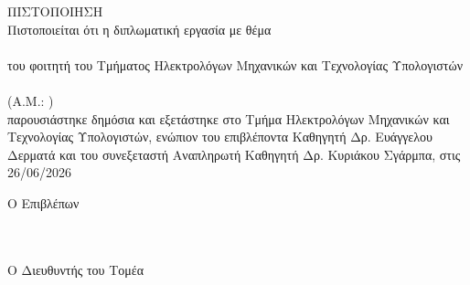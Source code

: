\pagestyle{empty}
\begin{center}
{\LARGE ΠΙΣΤΟΠΟΙΗΣΗ\\[1cm]}
\large Πιστοποιείται ότι η διπλωματική εργασία με θέμα\\[1cm]
\textbf{\large \doctitlegr }\\[1cm]
του φοιτητή του Τμήματος Ηλεκτρολόγων Μηχανικών και Τεχνολογίας Υπολογιστών\\[1.5cm]
\megr \\[0.5cm]
(Α.Μ.: \studnum )\\[1.5cm]
παρουσιάστηκε δημόσια και εξετάστηκε στο Τμήμα Ηλεκτρολόγων Μηχανικών και Τεχνολογίας Υπολογιστών, ενώπιον του επιβλέποντα Καθηγητή Δρ. Ευάγγελου Δερματά και του συνεξεταστή Αναπληρωτή Καθηγητή Δρ. Κυριάκου Σγάρμπα, στις\\[0.5cm]
\Large{26/06/2026}\\[1cm]
\end{center}
\begin{minipage}{0.5\textwidth}
\begin{flushleft} \large
Ο Επιβλέπων\\[0.5cm]
\supnamegr \\
\emph{\suptitlegr}\\
\end{flushleft}
\end{minipage}
\begin{minipage}{0.5\textwidth}
\begin{flushright} \large
Ο Διευθυντής του Τομέα\\[0.5cm]
\headofdivisiongr\\
\emph{\headofdivisiontitlegr}
\end{flushright}
\end{minipage}
